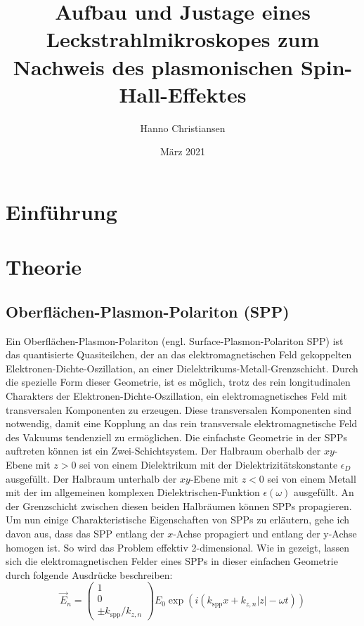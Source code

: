 \documentclass{article}
\title{Aufbau und Justage eines Leckstrahlmikroskopes zum Nachweis des plasmonischen Spin-Hall-Effektes}
\author{Hanno Christiansen}
\date{März 2021}
\begin{document}
	
\maketitle
\tableofcontents

\section{Einführung}
\section{Theorie}
	\subsection{Oberflächen-Plasmon-Polariton (SPP)}		
	Ein Oberflächen-Plasmon-Polariton (engl. Surface-Plasmon-Polariton SPP) ist das quantisierte Quasiteilchen, der an das elektromagnetischen Feld gekoppelten Elektronen-Dichte-Oszillation, an einer Dielektrikums-Metall-Grenzschicht. Durch die spezielle Form dieser Geometrie, ist es möglich, trotz des rein longitudinalen Charakters der Elektronen-Dichte-Oszillation, ein elektromagnetisches Feld mit transversalen Komponenten zu erzeugen. Diese transversalen Komponenten sind notwendig, damit eine Kopplung an das rein transversale elektromagnetische Feld des Vakuums tendenziell zu ermöglichen. Die einfachste Geometrie in der SPPs auftreten können ist ein Zwei-Schichtsystem. Der Halbraum oberhalb der $xy$-Ebene mit $z>0$ sei von einem Dielektrikum mit der Dielektrizitätskonstante $\epsilon_D$ ausgefüllt. Der Halbraum unterhalb der $xy$-Ebene mit $z<0$ sei von einem Metall mit der im allgemeinen komplexen Dielektrischen-Funktion $\epsilon(\omega)$ ausgefüllt. An der Grenzschicht zwischen diesen beiden Halbräumen können SPPs propagieren. Um nun einige Charakteristische Eigenschaften von SPPs zu erläutern, gehe ich davon aus, dass das SPP entlang der $x$-Achse propagiert und entlang der y-Achse homogen ist. So wird das Problem effektiv 2-dimensional. Wie in \cite{Maier.2007} gezeigt, lassen sich die elektromagnetischen Felder eines SPPs in dieser einfachen Geometrie durch folgende Ausdrücke beschreiben:
	\begin{equation}
		\label{eq:electric_field_spp}
		\vec{E}_n = \begin{pmatrix} 1 \\ 0 \\ \pm k_{\mathrm{spp}}/k_{z,n} \end{pmatrix} E_0 \exp\left(i(k_{\mathrm{spp}}x + k_{z, n}|z|-\omega t)\right)	
	\end{equation}
\end{document}
